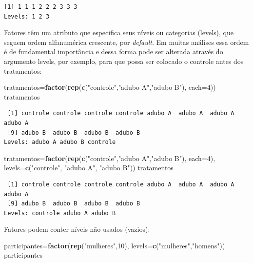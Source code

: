 \documentclass[12pt,portuguese,oneside]{book}
\newenvironment{Shaded}{\begin{snugshade}}{\end{snugshade}}
\newcommand{\KeywordTok}[1]{\textcolor[rgb]{0.13,0.29,0.53}{\textbf{#1}}}
\newcommand{\DataTypeTok}[1]{\textcolor[rgb]{0.13,0.29,0.53}{#1}}
\newcommand{\DecValTok}[1]{\textcolor[rgb]{0.00,0.00,0.81}{#1}}
\newcommand{\StringTok}[1]{\textcolor[rgb]{0.31,0.60,0.02}{#1}}
\newcommand{\NormalTok}[1]{#1}
\begin{document}
\begin{verbatim}
[1] 1 1 1 2 2 2 3 3 3
Levels: 1 2 3
\end{verbatim}

Fatores têm um atributo que especifica seus níveis ou categorias
(levels), que seguem ordem alfanumérica crescente, por \emph{default}.
Em muitas análises essa ordem é de fundamental importância e dessa forma
pode ser alterada através do argumento levels, por exemplo, para que
possa ser colocado o controle antes dos tratamentos:

\begin{Shaded}
\begin{Highlighting}[]
\NormalTok{tratamentos=}\KeywordTok{factor}\NormalTok{(}\KeywordTok{rep}\NormalTok{(}\KeywordTok{c}\NormalTok{(}\StringTok{"controle"}\NormalTok{,}\StringTok{"adubo A"}\NormalTok{,}\StringTok{"adubo B"}\NormalTok{), }\DataTypeTok{each=}\DecValTok{4}\NormalTok{))}
\NormalTok{tratamentos}
\end{Highlighting}
\end{Shaded}

\begin{verbatim}
 [1] controle controle controle controle adubo A  adubo A  adubo A  adubo A 
 [9] adubo B  adubo B  adubo B  adubo B 
Levels: adubo A adubo B controle
\end{verbatim}

\begin{Shaded}
\begin{Highlighting}[]
\NormalTok{tratamentos=}\KeywordTok{factor}\NormalTok{(}\KeywordTok{rep}\NormalTok{(}\KeywordTok{c}\NormalTok{(}\StringTok{"controle"}\NormalTok{,}\StringTok{"adubo A"}\NormalTok{,}\StringTok{"adubo B"}\NormalTok{), }\DataTypeTok{each=}\DecValTok{4}\NormalTok{), }
\DataTypeTok{levels=}\KeywordTok{c}\NormalTok{(}\StringTok{"controle"}\NormalTok{, }\StringTok{"adubo A"}\NormalTok{, }\StringTok{"adubo B"}\NormalTok{))}
\NormalTok{tratamentos}
\end{Highlighting}
\end{Shaded}

\begin{verbatim}
 [1] controle controle controle controle adubo A  adubo A  adubo A  adubo A 
 [9] adubo B  adubo B  adubo B  adubo B 
Levels: controle adubo A adubo B
\end{verbatim}

Fatores podem conter níveis não usados (vazios):

\begin{Shaded}
\begin{Highlighting}[]
\NormalTok{participantes=}\KeywordTok{factor}\NormalTok{(}\KeywordTok{rep}\NormalTok{(}\StringTok{"mulheres"}\NormalTok{,}\DecValTok{10}\NormalTok{), }\DataTypeTok{levels=}\KeywordTok{c}\NormalTok{(}\StringTok{"mulheres"}\NormalTok{,}\StringTok{"homens"}\NormalTok{))}
\NormalTok{participantes}
\end{Highlighting}
\end{Shaded}
\end{document}
